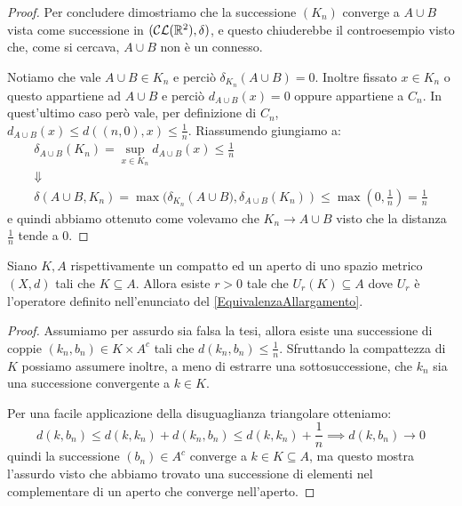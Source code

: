 \begin{proof}
	Per concludere dimostriamo che la successione $(K_n)$ converge a $A\cup B$ vista come successione in $(\mathcal{CL}(\mathbb R^2),\delta)$, e questo chiuderebbe il controesempio visto che, come si cercava, $A\cup B$ non è un connesso.
	
	Notiamo che vale $A\cup B\in K_n$ e perciò $\delta_{K_n}(A\cup B)=0$. 
	Inoltre fissato $x\in K_n$ o questo appartiene ad $A\cup B$ e perciò $d_{A\cup B}(x)=0$ oppure appartiene a $C_n$. In quest'ultimo caso però vale, per definizione di $C_n$, $d_{A\cup B}(x)\le d\left((n,0),x\right)\le \frac 1n$. Riassumendo giungiamo a:
	\begin{gather*}
		\delta_{A\cup B}(K_n)=\sup_{x\in K_n} d_{A\cup B}(x)\le \frac 1n \\
		\Downarrow \\
		\delta(A\cup B,K_n)=\max(\delta_{K_n}\left(A\cup B),\delta_{A\cup B}(K_n)\right)\le \max\left(0,\frac1n\right)=\frac 1n
	\end{gather*}
	e quindi abbiamo ottenuto come volevamo che $K_n\to A\cup B$ visto che la distanza $\frac 1n$ tende a $0$.
\end{proof}

\begin{lemma}\label{CompattoInAperto}
	Siano $K,A$ rispettivamente un compatto ed un aperto di uno spazio metrico $(X,d)$ tali che $K\subseteq A$. Allora esiste $r>0$ tale che $U_r(K)\subseteq A$ dove $U_r$ è l'operatore definito nell'enunciato del \cref{EquivalenzaAllargamento}.
\end{lemma}
\begin{proof}
	Assumiamo per assurdo sia falsa la tesi, allora esiste una successione di coppie $(k_n,b_n)\in K\times A^c$ tali che $d(k_n,b_n)\le \frac 1n$.
	Sfruttando la compattezza di $K$ possiamo assumere inoltre, a meno di estrarre una sottosuccessione, che $k_n$ sia una successione convergente a $k\in K$.
	
	Per una facile applicazione della disuguaglianza triangolare otteniamo:
	\begin{equation}
		d(k,b_n)\le d(k,k_n)+d(k_n,b_n)\le d(k,k_n)+\frac 1n \implies d(k,b_n)\to 0
	\end{equation}
	quindi la successione $(b_n)\in A^c$ converge a $k\in K\subseteq A$, ma questo mostra l'assurdo visto che abbiamo trovato una successione di elementi nel complementare di un aperto che converge nell'aperto.

\end{proof}



